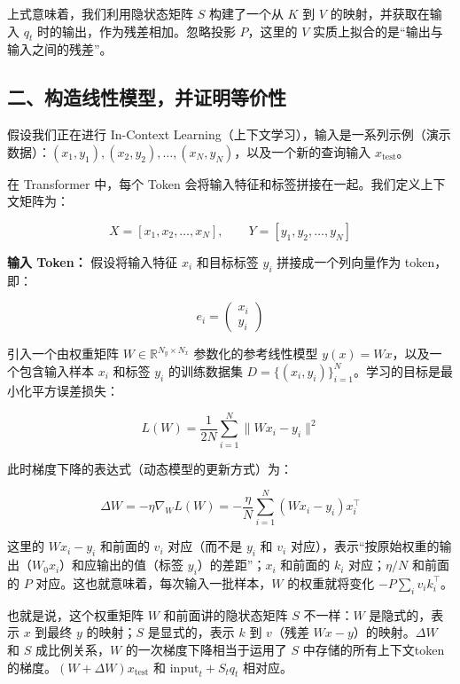 上式意味着，我们利用隐状态矩阵 \(S\) 构建了一个从 \(K\) 到 \(V\) 的映射，并获取在输入 \(q_t\) 时的输出，作为残差相加。忽略投影 \(P\)，这里的 \(V\) 实质上拟合的是``输出与输入之间的残差''。

\hypertarget{ux4e8cux6784ux9020ux7ebfux6027ux6a21ux578bux5e76ux8bc1ux660eux7b49ux4ef7ux6027}{%
\subsection{二、构造线性模型，并证明等价性}\label{ux4e8cux6784ux9020ux7ebfux6027ux6a21ux578bux5e76ux8bc1ux660eux7b49ux4ef7ux6027}}

假设我们正在进行 In-Context Learning（上下文学习），输入是一系列示例（演示数据）：\((x_1,y_1),(x_2,y_2),\ldots,(x_N,y_N)\)，以及一个新的查询输入 \(x_{\mathrm{test}}\)。

在 Transformer 中，每个 Token 会将输入特征和标签拼接在一起。我们定义上下文矩阵为：

\[
X=[x_1,x_2,\ldots,x_N],\qquad Y=[y_1,y_2,\ldots,y_N]
\]

\textbf{输入 Token：} 假设将输入特征 \(x_i\) 和目标标签 \(y_i\) 拼接成一个列向量作为 token，即：

\[
e_i=\begin{pmatrix}x_i\\y_i\end{pmatrix}
\]

引入一个由权重矩阵 \(W\in\mathbb{R}^{N_y\times N_x}\) 参数化的参考线性模型 \(y(x)=Wx\)，以及一个包含输入样本 \(x_i\) 和标签 \(y_i\) 的训练数据集 \(D=\{(x_i,y_i)\}_{i=1}^{N}\)。学习的目标是最小化平方误差损失：

\[
L(W)=\frac{1}{2N}\sum_{i=1}^{N}\|Wx_i-y_i\|^2
\]

此时梯度下降的表达式（动态模型的更新方式）为：

\[
\Delta W=-\eta\nabla_W L(W)=-\frac{\eta}{N}\sum_{i=1}^{N}(Wx_i-y_i)x_i^\top
\tag{3}
\]

这里的 \(Wx_i-y_i\) 和前面的 \(v_i\) 对应（而不是 \(y_i\) 和 \(v_i\) 对应），表示``按原始权重的输出（\(W_0x_i\)）和应输出的值（标签 \(y_i\)）的差距''；\(x_i\) 和前面的 \(k_i\) 对应；\(\eta/N\) 和前面的 \(P\) 对应。这也就意味着，每次输入一批样本，\(W\) 的权重就将变化 \(-P\sum_i v_i k_i^\top\)。

也就是说，这个权重矩阵 \(W\) 和前面讲的隐状态矩阵 \(S\) 不一样：\(W\) 是隐式的，表示 \(x\) 到最终 \(y\) 的映射；\(S\) 是显式的，表示 \(k\) 到 \(v\)（残差 \(Wx-y\)）的映射。\(\Delta W\) 和 \(S\) 成比例关系，\(W\) 的一次梯度下降相当于运用了 \(S\) 中存储的所有上下文token的梯度。\((W+\Delta W)x_{\mathrm{test}}\) 和 \(\mathrm{input}_t+S_tq_t\) 相对应。

